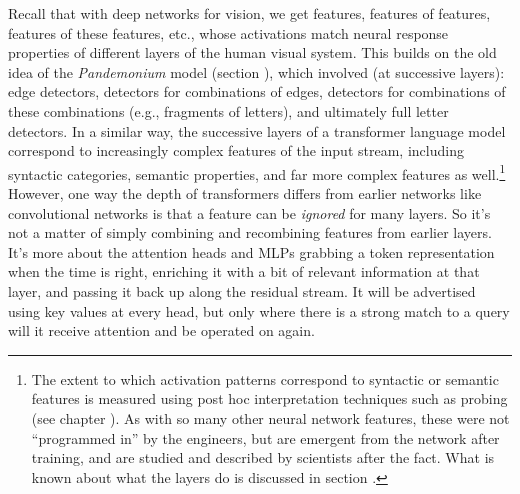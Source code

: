 Recall that with deep networks for vision,
we get features, features of features, features of these features, etc., whose
activations match neural response properties of different layers of the human
visual system. This builds on the old idea of the \emph{Pandemonium} model
(section ), which involved (at successive layers): edge
detectors, detectors for combinations of edges, detectors for combinations of
these combinations (e.g., fragments of letters), and ultimately full letter
detectors. In a similar way, the successive layers of a transformer language
model correspond to increasingly complex features of the input stream,
including syntactic categories, semantic properties, and far more complex
features as well.\footnote{The extent to which activation patterns correspond
to syntactic or semantic features is measured using post hoc interpretation
techniques such as probing (see chapter ). As with so many other neural network features,
these were not ``programmed in'' by the engineers, but are emergent from the
network after training, and are studied and described by scientists after the
fact. What is known about what the layers do is discussed in section .} However, one way the depth of transformers differs from earlier networks like convolutional networks is that a feature can be \emph{ignored} for many layers. So it's not a matter of simply combining and recombining features from earlier layers. It's more about the attention heads and MLPs grabbing a token representation when the time is right, enriching it with a bit of relevant information at that layer, and passing it back up along the residual stream. It will be advertised using key values at every head, but only where there is a strong match to a query will it receive attention and be operated on again.


